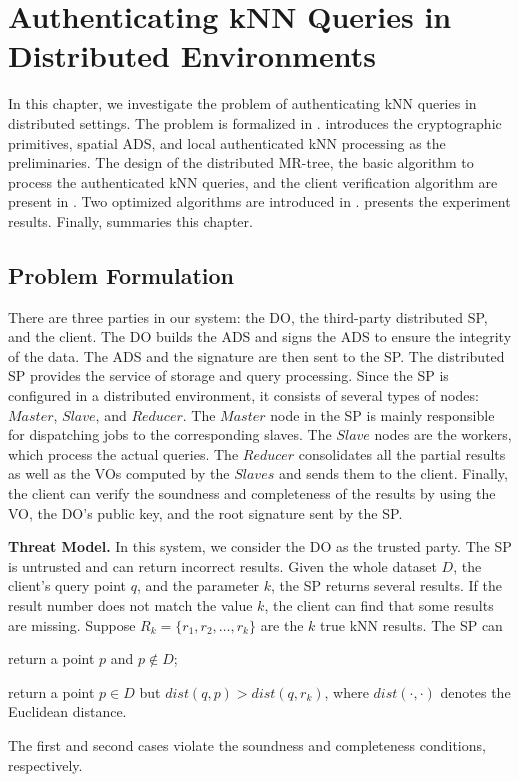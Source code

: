 \chapter{Authenticating {kNN} Queries in Distributed Environments}\label{chap:knn}

In this chapter, we investigate the problem of authenticating {kNN} queries in distributed settings. The problem is formalized in .  introduces the cryptographic primitives, spatial ADS, and local authenticated kNN processing as the preliminaries. The design of the distributed MR-tree, the basic algorithm to process the authenticated kNN queries, and the client verification algorithm are present in . Two optimized algorithms are introduced in .  presents the experiment results. Finally,  summaries this chapter.

\section{Problem Formulation}\label{sec:knn:problem}

There are three parties in our system: the DO, the third-party distributed SP, and the client. The DO builds the ADS and signs the ADS to ensure the integrity of the data. The ADS and the signature are then sent to the SP\@. The distributed SP provides the service of storage and query processing. Since the SP is configured in a distributed environment, it consists of several types of nodes: $Master$, $Slave$, and $Reducer$. The $Master$ node in the SP is mainly responsible for dispatching jobs to the corresponding slaves. The $Slave$ nodes are the workers, which process the actual queries. The $Reducer$ consolidates all the partial results as well as the VOs computed by the $Slaves$ and sends them to the client. Finally, the client can verify the soundness and completeness of the results by using the VO, the DO's public key, and the root signature sent by the SP\@.

\textbf{Threat Model.}
In this system, we consider the DO as the trusted party. The SP is untrusted and can return incorrect results. Given the whole dataset $D$, the client's query point $q$, and the parameter $k$, the SP returns several results. If the result number does not match the value $k$, the client can find that some results are missing. Suppose $R_{k}=\{r_{1},r_{2},\dots,r_{k}\}$ are the $k$ true kNN results. The SP can
\begin{inlineenum}
\item return a point $p$ and $p \notin D$;
\item return a point $p \in D$ but $dist(q,p) > dist(q,r_{k})$, where $dist(\cdot,\cdot)$ denotes the Euclidean distance.
\end{inlineenum}
The first and second cases violate the soundness and completeness conditions, respectively.

